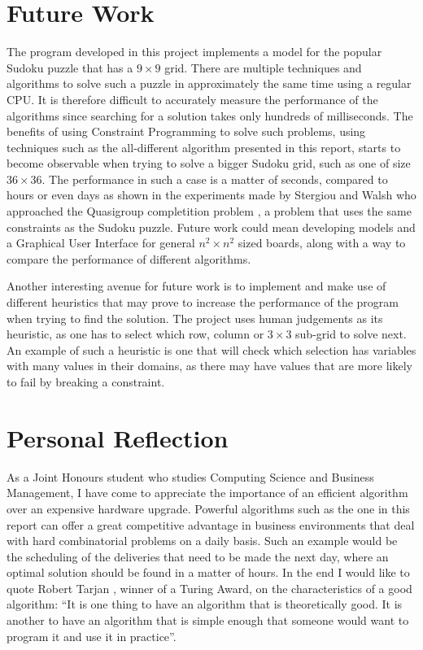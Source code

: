 \documentclass{l4proj}
\begin{document}
\section{Future Work}
\noindent The program developed in this project implements a model for the popular Sudoku puzzle that has a $9 \times 9$ grid. There are multiple techniques and algorithms to solve such a puzzle in approximately the same time using a regular CPU. It is therefore difficult to accurately measure the performance of the algorithms since searching for a solution takes only hundreds of milliseconds. The benefits of using Constraint Programming to solve such problems, using techniques such as the all-different algorithm presented in this report, starts to become observable when trying to solve a bigger Sudoku grid, such as one of size $36 \times 36$. The performance in such a case is a matter of seconds, compared to hours or even days as shown in the experiments made by Stergiou and Walsh \cite{stergiou1999difference} who approached the Quasigroup completition problem \cite{gomes2002completing}, a problem that uses the same constraints as the Sudoku puzzle. Future work could mean developing models and a Graphical User Interface for general $n^2\times n^2$ sized boards, along with a way to compare the performance of different algorithms.

\noindent Another interesting avenue for future work is to implement and make use of different heuristics that may prove to increase the performance of the program when trying to find the solution. The project uses human judgements as its heuristic, as one has to select which row, column or $3 \times 3$ sub-grid to solve next. An example of such a heuristic is one that will check which selection has variables with many values in their domains, as there may have values that are more likely to fail by breaking a constraint.

\section{Personal Reflection}
As a Joint Honours student who studies Computing Science and Business Management, I have come to appreciate the importance of an efficient algorithm over an expensive hardware upgrade. Powerful algorithms such as the one in this report can offer a great competitive advantage in business environments that deal with hard combinatorial problems on a daily basis. Such an example would be the scheduling of the deliveries that need to be made the next day, where an optimal solution should be found in a matter of hours. In the end I would like to quote Robert Tarjan \cite{tarjanart}, winner of a Turing Award, on the characteristics of a good algorithm: ``It is one thing to have an algorithm that is theoretically good. It is another to have an algorithm that is simple enough that someone would want to program it and use it in practice''.
\end{document}

